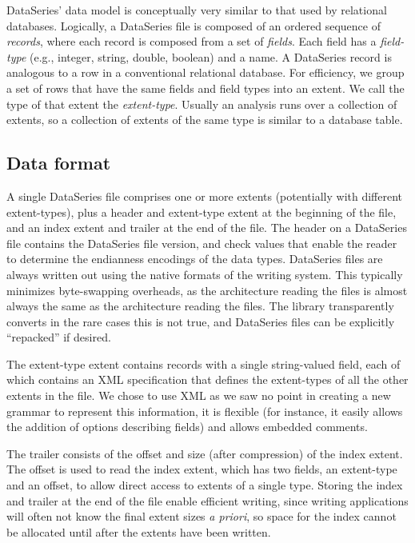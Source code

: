 \documentclass{acm_proc_article-sp}
\begin{document}
DataSeries' data model is conceptually very similar to that used by
relational databases.  Logically, a DataSeries file is composed of an
ordered sequence of {\it records}, where each record is composed from
a set of {\it fields}. Each field has a {\it field-type} (e.g.,
integer, string, double, boolean) and a name. A DataSeries record is
analogous to a row in a conventional relational database. For
efficiency, we group a set of rows that have the same fields and field
types into an extent.  We call the type of that extent the {\it
extent-type}.  Usually an analysis 
runs over a collection of
extents, so a collection of extents of the same type is similar to a
database table.

\subsection{Data format}

A single DataSeries file comprises one or more extents
(potentially with different extent-types), plus a header and
extent-type extent at the beginning of the file, and an index extent
and trailer at the end of the file. The header on a DataSeries file 
contains the DataSeries
file version, and check values that enable the reader to determine the
endianness encodings of the data types.  DataSeries files are always
written out using the native formats of the writing system. This 
typically minimizes byte-swapping overheads, as the architecture 
reading the files is almost always the same as the architecture reading
the files. The library transparently converts in the rare cases this
is not true, and DataSeries files can be explicitly ``repacked'' if desired. 

The extent-type extent contains records with a single string-valued
field, each of which contains an XML specification that defines the
extent-types of all the other extents in the file. We chose to use XML
as we saw no point in creating a new
grammar 
to represent this information, it is flexible (for
instance, it easily allows the addition of options describing
fields) and allows embedded comments.

The trailer
consists of the offset and size (after compression) of the index
extent.  The offset is used to read the index extent, which has two
fields, an extent-type and an offset, to allow direct access to
extents of a single type. Storing the index and trailer at the end
of the file enable efficient writing, since writing applications will
often not know
the final extent sizes \textit{a priori},
so space 
for the index cannot be allocated until after the extents have been written.
\end{document}
